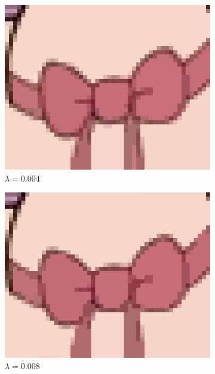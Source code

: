 \documentclass[10pt,twocolumn,letterpaper]{article}
\begin{document}
\begin{figure}
\begin{subfigure}{.48\linewidth}
\includegraphics[width=\linewidth]{gradminResults/gradmin_bow_large_0004.png}
\caption{$\lambda = 0.004$}
\end{subfigure}
\begin{subfigure}{.48\linewidth}
\includegraphics[width=\linewidth]{gradminResults/gradmin_bow_large_0008.png}
\caption{$\lambda = 0.008$}
\end{subfigure}
\begin{subfigure}{.48\linewidth}

\end{subfigure}
\end{figure}
\end{document}
